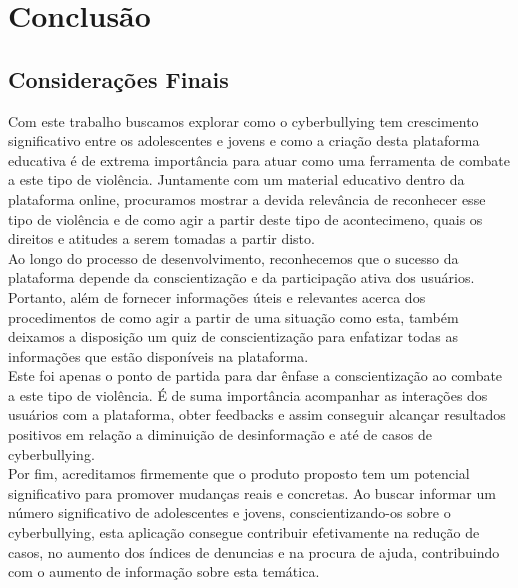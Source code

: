\chapter{Conclusão}

\section{Considerações Finais}
Com este trabalho buscamos explorar como o cyberbullying tem crescimento significativo entre os adolescentes e jovens e como a criação desta plataforma educativa é de extrema importância para atuar como uma ferramenta de combate a este tipo de violência. Juntamente com um material educativo dentro da plataforma online, procuramos mostrar a devida relevância de reconhecer esse tipo de violência e de como agir a partir deste tipo de acontecimeno, quais os direitos e atitudes a serem tomadas a partir disto.\\

Ao longo do processo de desenvolvimento, reconhecemos que o sucesso da plataforma depende da conscientização e da participação ativa dos usuários. Portanto, além de fornecer informações úteis e relevantes acerca dos procedimentos de como agir a partir de uma situação como esta, também deixamos a disposição um quiz de conscientização para enfatizar todas as informações que estão disponíveis na plataforma.\\


Este foi apenas o ponto de partida para dar ênfase a conscientização ao combate a este tipo de violência. É de suma importância acompanhar as interações dos usuários com a plataforma, obter feedbacks e assim conseguir alcançar resultados positivos em relação a diminuição de desinformação e até de casos de cyberbullying.\\


Por fim, acreditamos firmemente que o produto proposto tem um potencial significativo para promover mudanças reais e concretas. Ao buscar informar um número significativo de adolescentes e jovens, conscientizando-os sobre o cyberbullying, esta aplicação consegue contribuir efetivamente na redução de casos, no aumento dos índices de denuncias e na procura de ajuda, contribuindo com o aumento de informação sobre esta temática.
